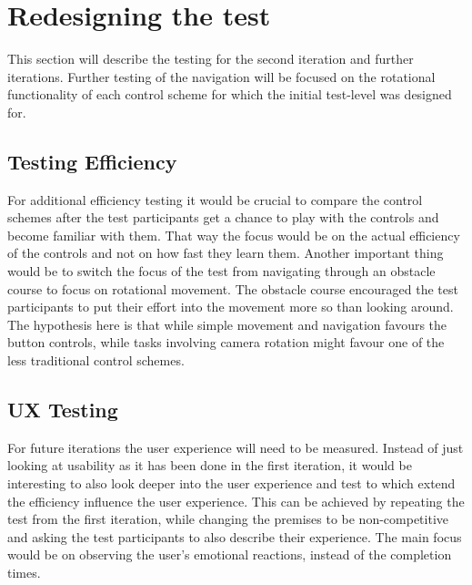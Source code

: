 \section{Redesigning the test}
This section will describe the testing for the second iteration and further iterations.
Further testing of the navigation will be focused on the rotational functionality of each control scheme for which the initial test-level was designed for. 

\subsection{Testing Efficiency}
For additional efficiency testing it would be crucial to compare the control schemes after the test participants get a chance to play with the controls and become familiar with them.
That way the focus would be on the actual efficiency of the controls and not on how fast they learn them.
Another important thing would be to switch the focus of the test from navigating through an obstacle course to focus on rotational movement. The obstacle course encouraged the test participants to put their effort into the movement more so than looking around. The hypothesis here is that while simple movement and navigation favours the button controls, while tasks involving camera rotation might favour one of the less traditional control schemes.

\subsection{UX Testing} 
For future iterations the user experience will need to be measured.
Instead of just looking at usability as it has been done in the first iteration, it would be interesting to also look deeper into the user experience and test to which extend the efficiency influence the user experience.
This can be achieved by repeating the test from the first iteration, while changing the premises to be non-competitive and asking the test participants to also describe their experience.
The main focus would be on observing the user's emotional reactions, instead of the completion times.

